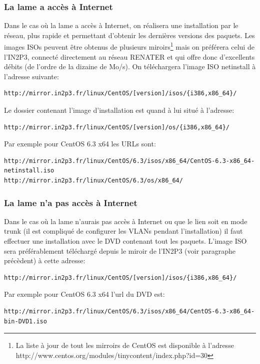 \documentclass[a4paper,oneside]{report}
\begin{document}
\subsubsection{La lame a accès à Internet}
Dans le cas où la lame a accès à Internet, on réalisera une installation par le réseau, plus rapide et permettant d'obtenir les dernières versions des paquets.
Les images ISOs peuvent être obtenus de plusieurs miroirs\footnote{La liste à jour de tout les mirroirs de CentOS est disponible à l'adresse http://www.centos.org/modules/tinycontent/index.php?id=30} mais on préférera celui de l'IN2P3, connecté directement au réseau RENATER et qui offre donc d'excellents débits (de l'ordre de la dizaine de Mo/s).\newline
On téléchargera l'image ISO netinstall à l'adresse suivante:
\begin{verbatim}
http://mirror.in2p3.fr/linux/CentOS/[version]/isos/{i386,x86_64}/
\end{verbatim}

\noindent Le dossier contenant l'image d'installation est quand à lui situé à l'adresse:
\begin{verbatim}
http://mirror.in2p3.fr/linux/CentOS/[version]/os/{i386,x86_64}/
\end{verbatim}

\noindent Par exemple pour CentOS 6.3 x64 les URLs sont:
\begin{verbatim}
http://mirror.in2p3.fr/linux/CentOS/6.3/isos/x86_64/CentOS-6.3-x86_64-netinstall.iso
http://mirror.in2p3.fr/linux/CentOS/6.3/os/x86_64/
\end{verbatim}

\subsubsection{La lame n'a pas accès à Internet}
Dans le cas où la lame n'aurais pas accès à Internet ou que le lien soit en mode trunk (il est compliqué de configurer les VLANs pendant l'installation) il faut effectuer une installation avec le DVD contenant tout les paquets.\newline
L'image ISO sera préférablement téléchargé depuis le miroir de l'IN2P3 (voir paragraphe précèdent) à cette adresse:
\begin{verbatim}
http://mirror.in2p3.fr/linux/CentOS/[version]/isos/{i386,x86_64}/
\end{verbatim}

\noindent Par exemple pour CentOS 6.3 x64 l'url du DVD est:
\begin{verbatim}
http://mirror.in2p3.fr/linux/CentOS/6.3/isos/x86_64/CentOS-6.3-x86_64-bin-DVD1.iso
\end{verbatim}
\end{document}
